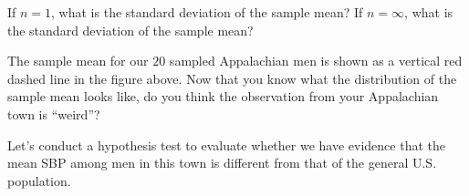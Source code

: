 \begin{question}{}
If $n=1$, what is the standard deviation of the sample mean? If $n=\infty$, what is the standard deviation of the sample mean?
\end{question}

\begin{question}{}
The sample mean for our $20$ sampled Appalachian men is shown as a vertical red dashed line in the figure above. Now that you know what the distribution of the sample mean looks like, do you think the observation from your Appalachian town is ``weird''?
\end{question}

\noindent Let's conduct a hypothesis test to evaluate whether we have evidence that the mean SBP among men in this town is different from that of the general U.S. population.

